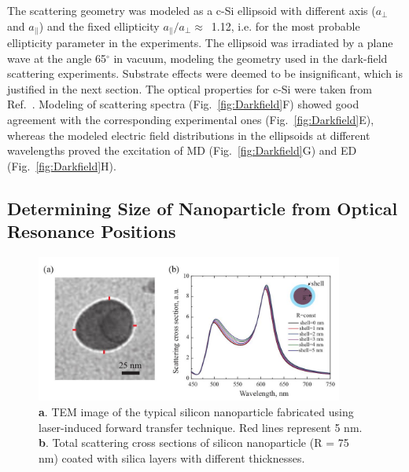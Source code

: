             The scattering geometry was modeled as a c-Si ellipsoid with different axis
        ($a_{\perp}$ and $a_{||}$) and the fixed ellipticity $a_{\parallel}/a_{\perp}\approx$~1.12, i.e. for
        the most probable ellipticity parameter in the experiments. The ellipsoid was irradiated by a plane wave
        at the angle 65$^{\circ}$ in vacuum, modeling the geometry used in the dark-field scattering experiments. Substrate effects
        were deemed to be insignificant, which is justified in the next section. The optical properties for
        c-Si were taken from Ref.~\cite{vuye1993temperature}. Modeling of scattering spectra (Fig.~\ref{fig:Darkfield}F) showed good agreement
        with the corresponding experimental ones (Fig.~\ref{fig:Darkfield}E), whereas the modeled electric field distributions
        in the ellipsoids at different wavelengths proved the excitation of MD (Fig.~\ref{fig:Darkfield}G) and ED (Fig.~\ref{fig:Darkfield}H).

    \subsection{Determining Size of Nanoparticle from Optical Resonance Positions}

        \begin{figure}[!ht]
                \begin{center}
                    \includegraphics[width=0.9\textwidth]{figs/results/char/CoreShell.jpg}
                \end{center}
                \caption{\textbf{a}. TEM image of the typical silicon nanoparticle fabricated using laser-induced
                            forward transfer technique. Red lines represent 5 nm. \textbf{b}. Total scattering cross sections of
                            silicon nanoparticle (R = 75 nm) coated with silica layers with different thicknesses.}
                \label{fig:CoreShell}
        \end{figure}

